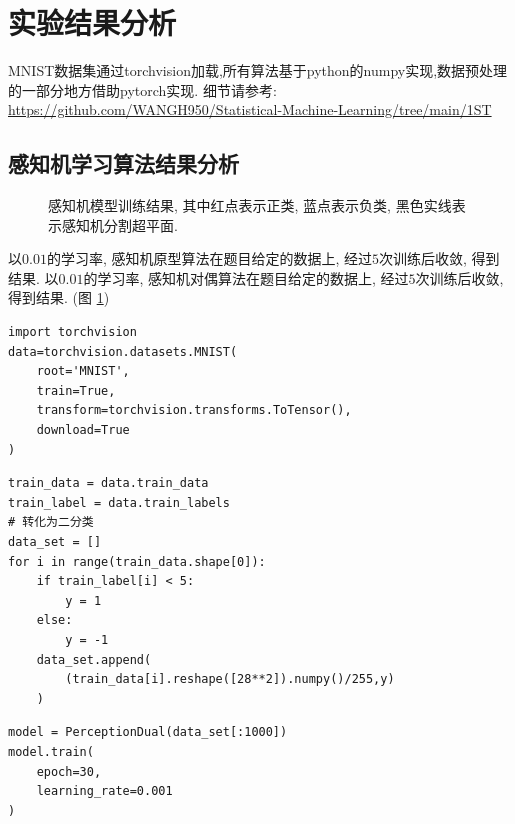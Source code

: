 \section{实验结果分析}
MNIST数据集通过torchvision加载,所有算法基于python的numpy实现,数据预处理的一部分地方借助pytorch实现. 细节请参考:\\
\url{https://github.com/WANGH950/Statistical-Machine-Learning/tree/main/1ST }

\subsection{感知机学习算法结果分析}

\begin{figure}[htpb]
    \centering
    \caption{感知机模型训练结果, 其中红点表示正类, 蓝点表示负类, 黑色实线表示感知机分割超平面.}
    \label{figure2}
\end{figure}

以$0.01$的学习率, 感知机原型算法在题目给定的数据上, 经过$5$次训练后收敛, 得到结果.
以$0.01$的学习率, 感知机对偶算法在题目给定的数据上, 经过$5$次训练后收敛, 得到结果. (图 \ref{figure2})

\begin{lstlisting}[caption = MNIST数据加载]
import torchvision
data=torchvision.datasets.MNIST(
    root='MNIST',
    train=True,
    transform=torchvision.transforms.ToTensor(),
    download=True
)
\end{lstlisting}
\begin{lstlisting}[caption = MNIST数据预处理]
train_data = data.train_data
train_label = data.train_labels
# 转化为二分类
data_set = []
for i in range(train_data.shape[0]):
    if train_label[i] < 5:
        y = 1
    else:
        y = -1
    data_set.append(
        (train_data[i].reshape([28**2]).numpy()/255,y)
    )
\end{lstlisting}
\begin{lstlisting}[caption = 使用对偶感知机算法处理MNIST数据]
model = PerceptionDual(data_set[:1000])
model.train(
    epoch=30,
    learning_rate=0.001
)
\end{lstlisting}

